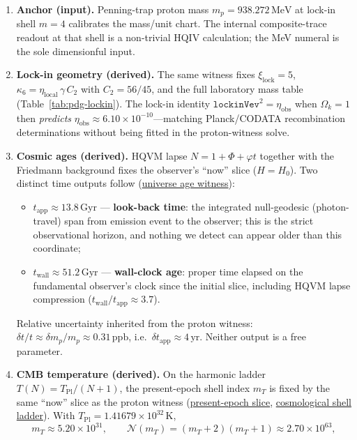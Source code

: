\documentclass[11pt]{amsart}
\begin{document}
\begin{enumerate}[label=(\arabic*),leftmargin=2em,nosep]
\item \textbf{Anchor (input).} Penning-trap proton mass $m_p=938.272\,\mathrm{MeV}$ at lock-in shell $m=4$ calibrates the mass/unit chart. The internal composite-trace readout at that shell is a non-trivial HQIV calculation; the MeV numeral is the sole dimensionful input.
\item \textbf{Lock-in geometry (derived).} The same witness fixes $\xi_{\mathrm{lock}}=5$, $\kappa_6=\eta_{\mathrm{local}}\,\gamma\,C_2$ with $C_2=56/45$, and the full laboratory mass table (Table~\ref{tab:pdg-lockin}). The lock-in identity $\texttt{lockinVev}^2=\eta_{\mathrm{obs}}$ when $\Omega_k=1$ then \emph{predicts} $\eta_{\mathrm{obs}}\approx 6.10\times 10^{-10}$---matching Planck/CODATA recombination determinations without being fitted in the proton-witness solve.
\item \textbf{Cosmic ages (derived).} HQVM lapse $N=1+\Phi+\varphi t$ together with the Friedmann background fixes the observer's ``now'' slice ($H=H_0$). Two distinct time outputs follow (\hyperref[lean:universe-age]{universe age witness}):
\begin{itemize}[nosep,leftmargin=1.5em]
\item $t_{\mathrm{app}}\approx 13.8\,\mathrm{Gyr}$ --- \textbf{look-back time}: the integrated null-geodesic (photon-travel) span from emission event to the observer; this is the strict observational horizon, and nothing we detect can appear older than this coordinate;
\item $t_{\mathrm{wall}}\approx 51.2\,\mathrm{Gyr}$ --- \textbf{wall-clock age}: proper time elapsed on the fundamental observer's clock since the initial slice, including HQVM lapse compression ($t_{\mathrm{wall}}/t_{\mathrm{app}}\approx 3.7$).
\end{itemize}
Relative uncertainty inherited from the proton witness: $\delta t/t\approx \delta m_p/m_p\approx 0.31\,\mathrm{ppb}$, i.e.\ $\delta t_{\mathrm{app}}\approx 4\,\mathrm{yr}$. Neither output is a free parameter.
\item \textbf{CMB temperature (derived).} On the harmonic ladder $T(N)=T_{\mathrm{Pl}}/(N+1)$, the present-epoch shell index $m_T$ is fixed by the same ``now'' slice as the proton witness (\hyperref[lean:now-slice]{present-epoch slice}, \hyperref[lean:cosmological-shell-ladder]{cosmological shell ladder}). With $T_{\mathrm{Pl}}=1.41679\times 10^{32}\,\mathrm{K}$,
\[
  m_T\approx 5.20\times 10^{31},
  \qquad
  \mathcal{N}(m_T)=(m_T+2)(m_T+1)\approx 2.70\times 10^{63},
\]
\end{enumerate}
\end{document}
